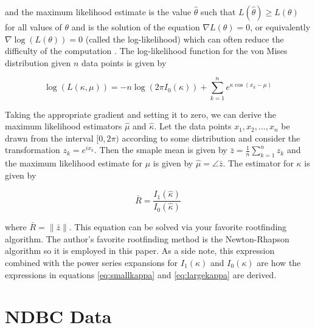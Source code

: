 \documentclass[12pt]{article}
\numberwithin{equation}{section}
\numberwithin{figure}{section}
\begin{document}
and the maximum likelihood estimate is the value $\hat{\theta}$ such that $L(\hat{\theta}) \ge L(\theta)$ for all values of $\theta$ and is the solution of the equation $\nabla L(\theta) = 0$, or equivalently $\nabla \log(L(\theta)) = 0$ (called the log-likelihood) which can often reduce the difficulty of the computation \cite{Larsen}. The log-likelihood function for the von Mises distribution given $n$ data points is given by 

\begin{equation}\label{eq:vmll}
\log(L(\kappa, \mu)) = -n\log( 2\pi I_0(\kappa))+ \sum_{k=1}^n e^{\kappa \cos(x_k-\mu)}
\end{equation}

Taking the appropriate gradient and setting it to zero, we can derive the maximum likelihood estimators $\hat{\mu}$ and $\hat{\kappa}$. Let the data points $x_1, x_2, ..., x_n$ be drawn from the interval $[0,2\pi)$ according to some distribution and consider the transformation $z_k = e^{i x_k}$. Then the smaple mean is given by $\bar{z} =\frac{1}{n}\sum_{k=1}^n z_k$ and the maximum likelihood estimate for $\mu$ is given by $\hat{\mu} = \angle\bar{z}$. The estimator for $\kappa$ is given by \cite{borradaile}

\begin{equation}
\label{eq:kmle}
\bar{R} = \frac{I_1(\hat{\kappa})}{I_0(\hat{\kappa})}
\end{equation}

where $\bar{R} = \|\bar{z}\|$. This equation can be solved via your favorite rootfinding algorithm. The author's favorite rootfinding method is the Newton-Rhapson algorithm so it is employed in this paper. As a side note, this expression combined with the power series expansions for $I_1(\kappa)$ and $I_0(\kappa)$ are how the expressions in equations \ref{eq:smallkappa} and \ref{eq:largekappa} are derived. 

%


\section{NDBC Data}
\end{document}

